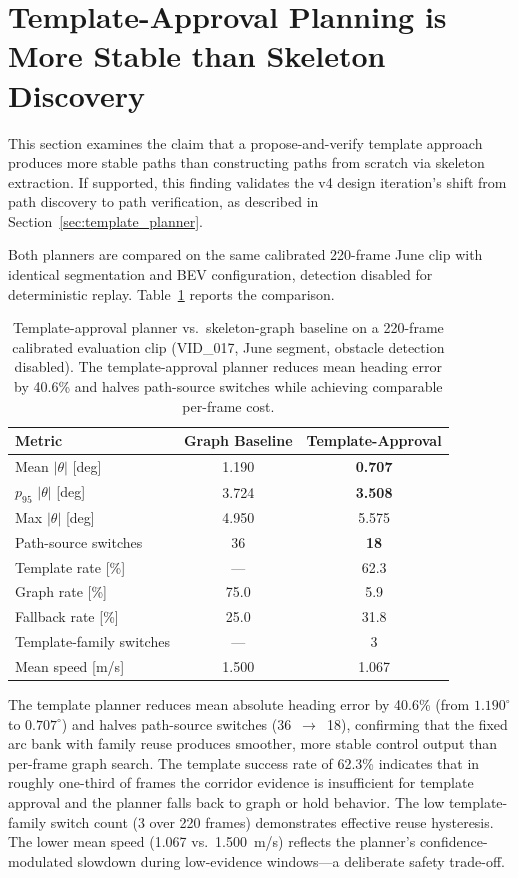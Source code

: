 \documentclass[12pt,letterpaper,oneside]{report}
\begin{document}
\section{Template-Approval Planning is More Stable than Skeleton Discovery}
\label{sec:claim_template_approval}
\label{sec:template_eval}

This section examines the claim that a propose-and-verify template approach produces more stable paths than constructing paths from scratch via skeleton extraction.  If supported, this finding validates the v4 design iteration's shift from path discovery to path verification, as described in Section~\ref{sec:template_planner}.

Both planners are compared on the same calibrated 220-frame June clip with identical segmentation and BEV configuration, detection disabled for deterministic replay.  Table~\ref{tab:template_eval} reports the comparison.

\begin{table}[h]
\centering
\caption{Template-approval planner vs.\ skeleton-graph baseline on a 220-frame calibrated evaluation clip (VID\_017, June segment, obstacle detection disabled). The template-approval planner reduces mean heading error by 40.6\% and halves path-source switches while achieving comparable per-frame cost.}
\label{tab:template_eval}
\begin{tabular}{lcc}
\toprule
Metric & Graph Baseline & Template-Approval \\
\midrule
Mean $|\theta|$ [deg]     & 1.190 & \textbf{0.707} \\
$p_{95}$ $|\theta|$ [deg] & 3.724 & \textbf{3.508} \\
Max $|\theta|$ [deg]      & 4.950 & 5.575 \\
Path-source switches       & 36    & \textbf{18} \\
Template rate [\%]         & ---   & 62.3 \\
Graph rate [\%]            & 75.0  & 5.9 \\
Fallback rate [\%]         & 25.0  & 31.8 \\
Template-family switches   & ---   & 3 \\
Mean speed [m/s]           & 1.500 & 1.067 \\
\bottomrule
\end{tabular}
\end{table}

The template planner reduces mean absolute heading error by 40.6\% (from $1.190^\circ$ to $0.707^\circ$) and halves path-source switches (36~$\to$~18), confirming that the fixed arc bank with family reuse produces smoother, more stable control output than per-frame graph search.  The template success rate of 62.3\% indicates that in roughly one-third of frames the corridor evidence is insufficient for template approval and the planner falls back to graph or hold behavior.  The low template-family switch count (3 over 220 frames) demonstrates effective reuse hysteresis.  The lower mean speed (1.067 vs.\ 1.500~m/s) reflects the planner's confidence-modulated slowdown during low-evidence windows---a deliberate safety trade-off.
\end{document}
